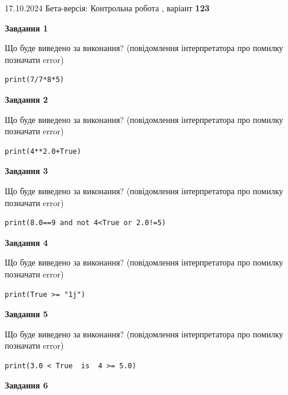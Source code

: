 \documentclass[12pt, ukrainian]{article}
\begin{document}
{\Large{17.10.2024 Бета-версія: Контрольна робота , варіант  \No \textbf { 123 }\par}}
{
\begin {large}
{\begin {center}\textbf{Завдання 1}\end {center}}

Що буде виведено за виконання? (повідомлення інтерпретатора про помилку позначати error)\par
\begin{verbatim}
print(7/7*8*5)
\end{verbatim}

{\begin {center}\textbf{Завдання 2}\end {center}}

Що буде виведено за виконання? (повідомлення інтерпретатора про помилку позначати error)\par
\begin{verbatim}
print(4**2.0+True)
\end{verbatim}

{\begin {center}\textbf{Завдання 3}\end {center}}

Що буде виведено за виконання? (повідомлення інтерпретатора про помилку позначати error)\par
\begin{verbatim}
print(8.0==9 and not 4<True or 2.0!=5)
\end{verbatim}

{\begin {center}\textbf{Завдання 4}\end {center}}

Що буде виведено за виконання? (повідомлення інтерпретатора про помилку позначати error)\par
\begin{verbatim}
print(True >= "1j")
\end{verbatim}

{\begin {center}\textbf{Завдання 5}\end {center}}

Що буде виведено за виконання? (повідомлення інтерпретатора про помилку позначати error)\par
\begin{verbatim}
print(3.0 < True  is  4 >= 5.0)
\end{verbatim}

{\begin {center}\textbf{Завдання 6}\end {center}}


\end{large}}
\end{document}
